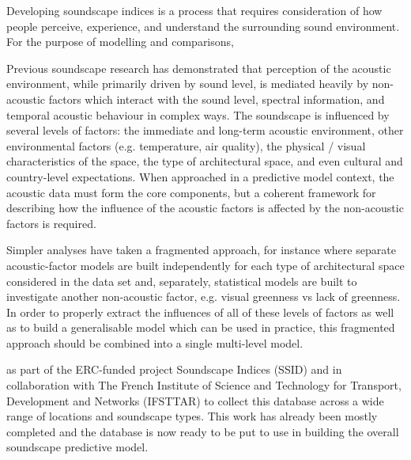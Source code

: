 Developing soundscape indices is a process that requires consideration of how people perceive, experience, and understand the surrounding sound environment. For the purpose of modelling and comparisons,

Previous soundscape research has demonstrated that perception of the acoustic environment, while primarily driven by sound level, is mediated heavily by non-acoustic factors which interact with the sound level, spectral information, and temporal acoustic behaviour in complex ways. The soundscape is influenced by several levels of factors: the immediate and long-term acoustic environment, other environmental factors (e.g. temperature, air quality), the physical / visual characteristics of the space, the type of architectural space, and even cultural and country-level expectations. When approached in a predictive model context, the acoustic data must form the core components, but a coherent framework for describing how the influence of the acoustic factors is affected by the non-acoustic factors is required.

Simpler analyses have taken a fragmented approach, for instance where separate acoustic-factor models are built independently for each type of architectural space considered in the data set and, separately, statistical models are built to investigate another non-acoustic factor, e.g. visual greenness vs lack of greenness. In order to properly extract the influences of all of these levels of factors as well as to build a generalisable model which can be used in practice, this fragmented approach should be combined into a single multi-level model.

 as part of the ERC-funded project Soundscape Indices (SSID) and in collaboration with The French Institute of Science and Technology for Transport, Development and Networks (IFSTTAR) to collect this database across a wide range of locations and soundscape types. This work has already been mostly completed and the database is now ready to be put to use in building the overall soundscape predictive model.

